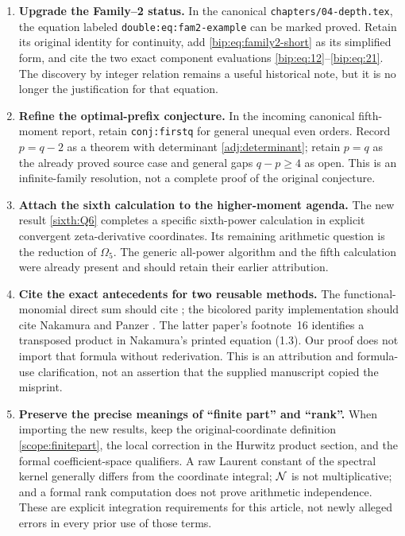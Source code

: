 \begin{enumerate}
\item \textbf{Upgrade the Family--2 status.}
In the canonical \texttt{chapters/04-depth.tex}, the equation labeled
\texttt{double:eq:fam2-example} can be marked proved.
Retain its original identity for continuity, add
\eqref{bip:eq:family2-short} as its simplified form, and cite the
two exact component evaluations \eqref{bip:eq:12}--\eqref{bip:eq:21}.
The discovery by integer relation remains a useful historical note,
but it is no longer the justification for that equation.

\item \textbf{Refine the optimal-prefix conjecture.}
In the incoming canonical fifth-moment report, retain
\texttt{conj:firstq} for general unequal even orders.
Record $p=q-2$ as a theorem with determinant
\eqref{adj:determinant}; retain $p=q$ as the already proved source
case and general gaps $q-p\ge4$ as open.
This is an infinite-family resolution, not a complete proof of the
original conjecture.

\item \textbf{Attach the sixth calculation to the higher-moment agenda.}
The new result \eqref{sixth:Q6} completes a specific sixth-power
calculation in explicit convergent zeta-derivative coordinates.
Its remaining arithmetic question is the reduction of $\Omega_5$.
The generic all-power algorithm and the fifth calculation were
already present and should retain their earlier attribution.

\item \textbf{Cite the exact antecedents for two reusable methods.}
The functional-monomial direct sum should cite
\cite[Proposition~4.10]{Guo2014}; the bicolored parity implementation
should cite Nakamura and Panzer \cite{bip:Nakamura2012,bip:Panzer2017}.
The latter paper's footnote~16 identifies a transposed product in
Nakamura's printed equation (1.3).  Our proof does not import that
formula without rederivation.  This is an attribution and formula-use
clarification, not an assertion that the supplied manuscript copied
the misprint.

\item \textbf{Preserve the precise meanings of ``finite part'' and ``rank''.}
When importing the new results, keep the original-coordinate
definition \eqref{scope:finitepart}, the local correction in the
Hurwitz product section, and the formal coefficient-space qualifiers.
A raw Laurent constant of the spectral kernel generally differs
from the coordinate integral; $\mathcal N$ is not multiplicative; and a
formal rank computation does not prove arithmetic independence.
These are explicit integration requirements for this article, not
newly alleged errors in every prior use of those terms.
\end{enumerate}

